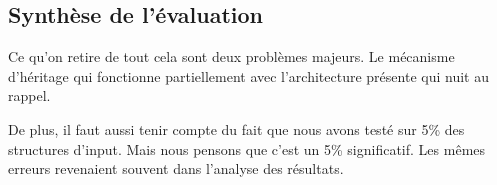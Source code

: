 \subsection{Synthèse de l'évaluation}


Ce qu'on retire de tout cela sont deux problèmes majeurs. Le mécanisme d'héritage qui fonctionne partiellement avec l'architecture présente qui nuit au rappel.

De plus, il faut aussi tenir compte du fait que nous avons testé sur 5\% des structures d'input. Mais nous pensons que c'est un 5\% significatif. Les mêmes erreurs revenaient souvent dans l'analyse des résultats.

